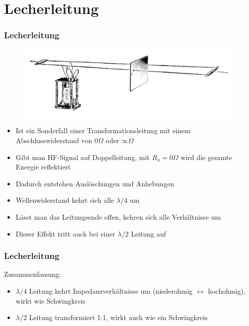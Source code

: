 \section*{Lecherleitung}
\begin{frame}
  \frametitle{Lecherleitung}
  \begin{center}
    \begin{figure}
      \includegraphics[width=\textwidth,height=.2\textheight,keepaspectratio]{a10/Lecher_wires_and_oscillator_1932.png}
    \end{figure}
  \end{center}
  \begin{itemize}
    \item Ist ein Sonderfall einer Transformationsleitung mit einem Abschlusswiderstand von $0 \Omega$ oder $\infty \Omega$
    \item Gibt man HF-Signal auf Doppelleitung, mit $R_a = 0 \Omega$ wird die gesamte Energie reflektiert
    \item Dadurch entstehen Auslöschungen und Anhebungen
    \item Wellenwiderstand kehrt sich alle $\lambda /4$ um
    \item Lässt man das Leitungsende offen, kehren sich alle Verhältnisse um
    \item Dieser Effekt tritt auch bei einer $\lambda /2$ Leitung auf
  \end{itemize}
\end{frame}

\begin{frame}
  \frametitle{Lecherleitung}

  Zusammenfassung:

  \begin{itemize}
    \item $\lambda /4$ Leitung kehrt Impedanzverhältnisse um (niederohmig $\leftrightarrow$ hochohmig), wirkt wie Schwingkreis
    \item $\lambda /2$ Leitung transformiert 1:1, wirkt auch wie ein Schwingkreis
  \end{itemize}

\end{frame}

